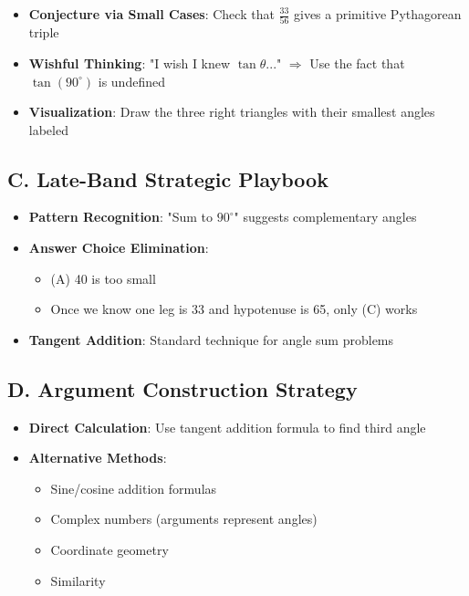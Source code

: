 \documentclass[12pt]{article}
\begin{document}
\begin{strategicbox}
\begin{itemize}[leftmargin=*]
    \item \textbf{Conjecture via Small Cases}: Check that $\frac{33}{56}$ gives a primitive Pythagorean triple
    
    \item \textbf{Wishful Thinking}: "I wish I knew $\tan\theta$..." $\Rightarrow$ Use the fact that $\tan(90^{\circ})$ is undefined
    
    \item \textbf{Visualization}: Draw the three right triangles with their smallest angles labeled
\end{itemize}

\subsection*{C. Late-Band Strategic Playbook}
\begin{itemize}[leftmargin=*]
    \item \textbf{Pattern Recognition}: "Sum to $90^{\circ}$" suggests complementary angles
    
    \item \textbf{Answer Choice Elimination}: 
    \begin{itemize}
        \item (A) 40 is too small
        \item Once we know one leg is 33 and hypotenuse is 65, only (C) works
    \end{itemize}
    
    \item \textbf{Tangent Addition}: Standard technique for angle sum problems
\end{itemize}

\subsection*{D. Argument Construction Strategy}
\begin{itemize}[leftmargin=*]
    \item \textbf{Direct Calculation}: Use tangent addition formula to find third angle
    
    \item \textbf{Alternative Methods}:
    \begin{itemize}
        \item Sine/cosine addition formulas
        \item Complex numbers (arguments represent angles)
        \item Coordinate geometry
        \item Similarity
    \end{itemize}
\end{itemize}


\end{strategicbox}
\end{document}

